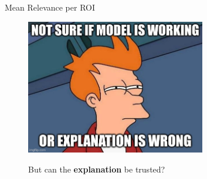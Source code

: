 \documentclass[aspectratio=169,xcolor={table, dvipsnames}]{beamer}
\renewcommand{\emph}[1]{\textbf{#1}}
\begin{document}
\begin{frame}{Mean Relevance per ROI}
	
\end{frame}
\begin{frame}[plain]
	\begin{center}
		\begin{figure}
			\href{https://knowyourmeme.com/memes/futurama-fry-not-sure-if}{
				\includegraphics[width=0.7\textwidth]{figures/fry-and-xai-2.png
				}}
			\caption*{But can the \emph{explanation} be trusted?}
		\end{figure}

	\end{center}
\end{frame}


\end{document}
